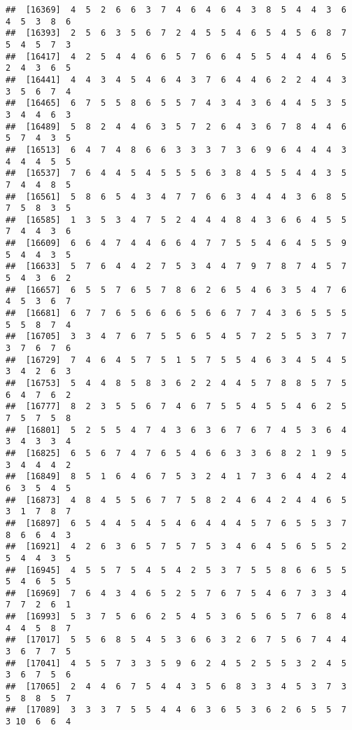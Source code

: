 \documentclass[
]{book}
\begin{document}
\begin{verbatim}
##  [16369]  4  5  2  6  6  3  7  4  6  4  6  4  3  8  5  4  4  3  6  4  5  3  8  6
##  [16393]  2  5  6  3  5  6  7  2  4  5  5  4  6  5  4  5  6  8  7  5  4  5  7  3
##  [16417]  4  2  5  4  4  6  6  5  7  6  6  4  5  5  4  4  4  6  5  2  4  3  6  5
##  [16441]  4  4  3  4  5  4  6  4  3  7  6  4  4  6  2  2  4  4  3  3  5  6  7  4
##  [16465]  6  7  5  5  8  6  5  5  7  4  3  4  3  6  4  4  5  3  5  3  4  4  6  3
##  [16489]  5  8  2  4  4  6  3  5  7  2  6  4  3  6  7  8  4  4  6  5  7  4  3  5
##  [16513]  6  4  7  4  8  6  6  3  3  3  7  3  6  9  6  4  4  4  3  4  4  4  5  5
##  [16537]  7  6  4  4  5  4  5  5  5  6  3  8  4  5  5  4  4  3  5  7  4  4  8  5
##  [16561]  5  8  6  5  4  3  4  7  7  6  6  3  4  4  4  3  6  8  5  7  5  8  3  5
##  [16585]  1  3  5  3  4  7  5  2  4  4  4  8  4  3  6  6  4  5  5  7  4  4  3  6
##  [16609]  6  6  4  7  4  4  6  6  4  7  7  5  5  4  6  4  5  5  9  5  4  4  3  5
##  [16633]  5  7  6  4  4  2  7  5  3  4  4  7  9  7  8  7  4  5  7  5  4  3  6  2
##  [16657]  6  5  5  7  6  5  7  8  6  2  6  5  4  6  3  5  4  7  6  4  5  3  6  7
##  [16681]  6  7  7  6  5  6  6  6  5  6  6  7  7  4  3  6  5  5  5  5  5  8  7  4
##  [16705]  3  3  4  7  6  7  5  5  6  5  4  5  7  2  5  5  3  7  7  3  7  6  7  6
##  [16729]  7  4  6  4  5  7  5  1  5  7  5  5  4  6  3  4  5  4  5  3  4  2  6  3
##  [16753]  5  4  4  8  5  8  3  6  2  2  4  4  5  7  8  8  5  7  5  6  4  7  6  2
##  [16777]  8  2  3  5  5  6  7  4  6  7  5  5  4  5  5  4  6  2  5  7  5  7  5  8
##  [16801]  5  2  5  5  4  7  4  3  6  3  6  7  6  7  4  5  3  6  4  3  4  3  3  4
##  [16825]  6  5  6  7  4  7  6  5  4  6  6  3  3  6  8  2  1  9  5  3  4  4  4  2
##  [16849]  8  5  1  6  4  6  7  5  3  2  4  1  7  3  6  4  4  2  4  6  3  5  4  5
##  [16873]  4  8  4  5  5  6  7  7  5  8  2  4  6  4  2  4  4  6  5  3  1  7  8  7
##  [16897]  6  5  4  4  5  4  5  4  6  4  4  4  5  7  6  5  5  3  7  8  6  6  4  3
##  [16921]  4  2  6  3  6  5  7  5  7  5  3  4  6  4  5  6  5  5  2  5  4  4  3  5
##  [16945]  4  5  5  7  5  4  5  4  2  5  3  7  5  5  8  6  6  5  5  5  4  6  5  5
##  [16969]  7  6  4  3  4  6  5  2  5  7  6  7  5  4  6  7  3  3  4  7  7  2  6  1
##  [16993]  5  3  7  5  6  6  2  5  4  5  3  6  5  6  5  7  6  8  4  4  4  5  8  7
##  [17017]  5  5  6  8  5  4  5  3  6  6  3  2  6  7  5  6  7  4  4  3  6  7  7  5
##  [17041]  4  5  5  7  3  3  5  9  6  2  4  5  2  5  5  3  2  4  5  3  6  7  5  6
##  [17065]  2  4  4  6  7  5  4  4  3  5  6  8  3  3  4  5  3  7  3  5  8  8  5  7
##  [17089]  3  3  3  7  5  5  4  4  6  3  6  5  3  6  2  6  5  5  7  3 10  6  6  4

\end{verbatim}
\end{document}
